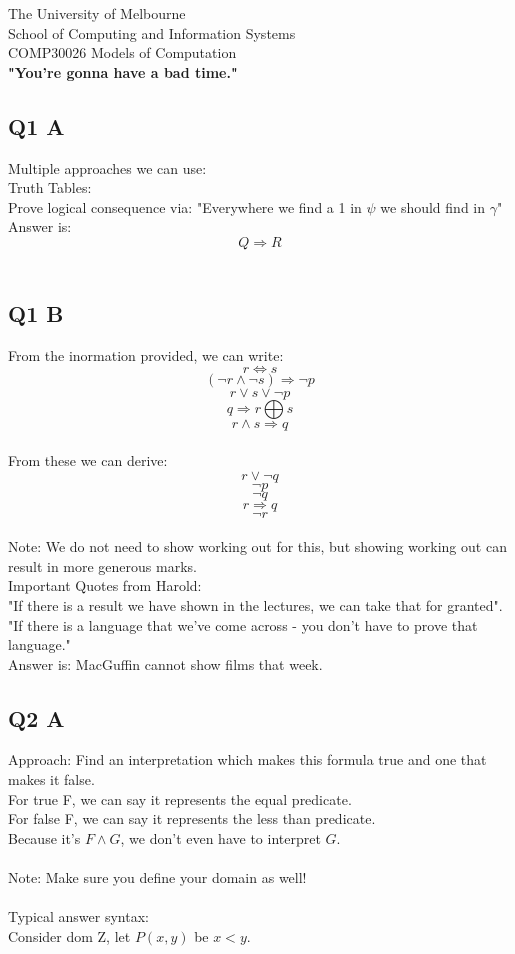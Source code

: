 \documentclass[12pt]{article}
\newcommand{\impl}{\mathbin{\Rightarrow}}
\newcommand{\biim}{\mathbin{\Leftrightarrow}}
\begin{document}
\begin{center}
{\sc The University of Melbourne
\\
School of Computing and Information Systems
\\ 
COMP30026 Models of Computation}
\bigskip \\
{\Large\bf "You're gonna have a bad time."}
\end{center}

\subsection*{Q1 A}

Multiple approaches we can use: \\
Truth Tables: \\
Prove logical consequence via: "Everywhere we find a 1 in $\psi$ we should find in $\gamma$" \\
Answer is: $$Q \impl R$$ \\

\subsection*{Q1 B}

From the inormation provided, we can write: \\
$$ r \biim s $$
$$ (\neg r \land \neg s) \impl \neg p $$
$$ r \lor s \lor \neg p $$
$$ q \impl r \bigoplus s $$ 
$$ r \land s \impl q $$ \\
From these we can derive: \\
$$r \lor \neg q $$
$$\neg p$$
$$\neg q$$
$$r \impl q$$
$$\neg r$$\\
Note: We do not need to show working out for this, but showing working out can result in more generous marks. \\
Important Quotes from Harold:\\
"If there is a result we have shown in the lectures, we can take that for granted". \\
"If there is a language that we've come across - you don't have to prove that language." \\

Answer is: MacGuffin cannot show films that week.

\subsection*{Q2 A}

Approach: Find an interpretation which makes this formula true and one that makes it false.\\
For true F, we can say it represents the equal predicate.\\
For false F, we can say it represents the less than predicate.\\
Because it's $F \land G$, we don't even have to interpret $G$.\\\\
Note: Make sure you define your domain as well! \\\\
Typical answer syntax: \\
Consider dom Z, let $P(x, y)$ be $x < y$. \\
\end{document}
